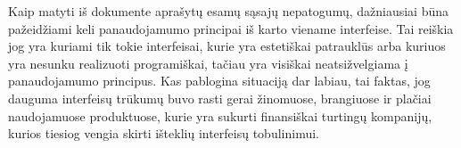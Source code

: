 Kaip matyti iš dokumente aprašytų esamų sąsajų nepatogumų, dažniausiai būna
pažeidžiami keli panaudojamumo principai iš karto viename interfeise. Tai
reiškia jog yra kuriami tik tokie interfeisai, kurie yra estetiškai patrauklūs arba
kuriuos yra nesunku realizuoti programiškai, tačiau yra visiškai neatsižvelgiama į
panaudojamumo principus. Kas pablogina situaciją dar labiau, tai faktas, jog dauguma
interfeisų trūkumų buvo rasti gerai žinomuose, brangiuose ir plačiai naudojamuose produktuose, 
kurie yra sukurti finansiškai turtingų kompanijų, kurios tiesiog vengia skirti išteklių
interfeisų tobulinimui.
